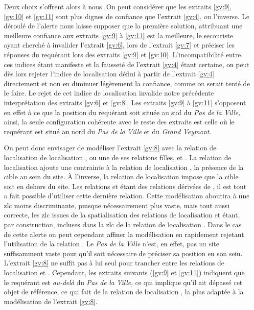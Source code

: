 Deux choix s'offrent alors à nous. On peut considérer que les extraits
\ref{gv:9}, \ref{gv:10} et \ref{gv:11} sont plus dignes de confiance
que l'extrait \ref{gv:4}, ou l'inverse. Le déroulé de l'alerte nous
laisse supposer que la première solution, attribuant une meilleure
confiance aux extraits \ref{gv:9} à \ref{gv:11} est la meilleure, le
secouriste ayant cherché à invalider l'extrait \ref{gv:6}, lors de
l'extrait \ref{gv:7} et préciser les réponses du requérant lors des
extraits \ref{gv:9} et \ref{gv:10}. L'incompatibilité entre ces
indices étant manifeste et la fausseté de l'extrait \ref{gv:4} étant
certaine, on peut dès lors rejeter l'indice de localisation défini à
partir de l'extrait \ref{gv:4} directement et non en diminuer
légèrement la confiance, comme on serait tenté de le faire. Le rejet
de cet indice de localisation invalide notre précédente interprétation
des extraits \ref{gv:6} et \ref{gv:8}. Les extraits \ref{gv:9} à
\ref{gv:11} s'opposent en effet à ce que la position du requérant soit
située au sud du \emph{Pas de la Ville,} ainsi, la seule configuration
cohérente avec le reste des extraits est celle où le requérant est
situé au nord du \emph{Pas de la Ville} et du \emph{Grand Veymont}.

On peut donc envisager de modéliser l'extrait \ref{gv:8} avec la
relation de localisation de localisation , ou
une de ses relations filles,  et
. La relation de localisation
 ajoute une contrainte à la
relation de localisation , la présence de la
cible au sein du site. À l'inverse, la relation de localisation
 impose que la cible soit en dehors
du site. Les relations  et
 étant des relations dérivées de
, il est tout a fait possible d'utiliser cette
dernière relation. Cette modélisation aboutira à une \ac{zlc} moins
discriminante, puisque nécessairement plus vaste, mais tout aussi
correcte, les \ac{zlc} issues de la spatialisation des relations de
localisation  et
 étant, par construction, incluses
dans la \ac{zlc} de la relation de localisation
. Dans le cas de cette alerte on peut
cependant affiner la modélisation en rapidement rejetant l'utilisation
de la relation . Le \emph{Pas de
  la Ville} n'est, en effet, pas un site suffisamment vaste pour qu'il
soit nécessaire de préciser sa position en son sein. L'extrait
\ref{gv:8} ne suffit pas à lui seul pour trancher entre les relations
de localisation  et
. Cependant, les extraits suivants
(\ref{gv:9} et \ref{gv:11}) indiquent que le requérant est
\emph{au-delà} du \emph{Pas de la Ville,} ce qui implique qu'il ait
dépassé cet objet de référence, ce qui fait de la relation de
localisation , la plus adaptée à la
modélisation de l'extrait \ref{gv:8}.

